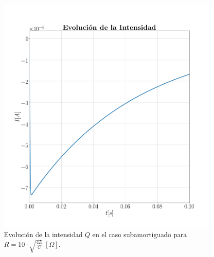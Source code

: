 \documentclass[journal]{IEEEtran}
\begin{document}
\begin{figure}[!htb]
    \centering
    \includegraphics[width=\linewidth,trim={40 70 70 70},clip]{intensidadsobreamortiguado.png}
    \caption{Evolución de la intensidad $Q$ en el caso subamortiguado para $R=10 \cdot\sqrt{\frac{4L}{C}}~[\Omega]$.}
    \label{fig:intensidadamortiguado}
\end{figure}
\end{document}
